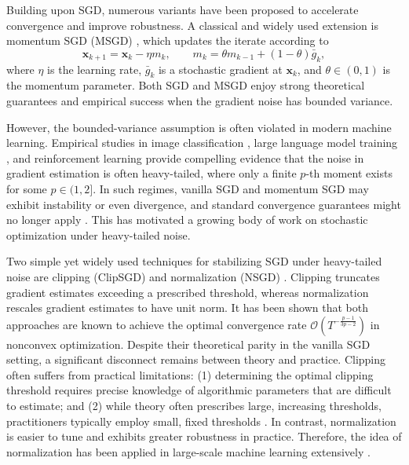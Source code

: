 \documentclass{article}
\newcommand{\bx}{\boldsymbol{x}}
\newcommand{\barg}{\bar{g}}
\theoremstyle{plain}
\theoremstyle{definition}
\theoremstyle{remark}
\begin{document}
Building upon SGD, numerous variants have been proposed to accelerate convergence and improve robustness. A classical and widely used extension is momentum SGD (MSGD) \citep{Polyak1964Some, Liu2020Improved}, which updates the iterate according to
\begin{equation}\label{rule2}
\bx_{k+1} = \bx_k - \eta m_k,
\qquad
m_k = \theta m_{k-1} + (1-\theta)\barg_k,
\end{equation}
where $\eta$ is the learning rate, $\barg_k$ is a stochastic gradient at $\bx_k$, and $\theta \in (0,1)$ is the momentum parameter. Both SGD and MSGD enjoy strong theoretical guarantees and empirical success when the gradient noise has bounded variance.

However, the bounded-variance assumption is often violated in modern machine learning. Empirical studies in image classification \citep{Battash2024Revisiting}, large language model training \citep{Zhang2020Adaptive,Ahn2024Linear}, and reinforcement learning \citep{Garg2021Proximal} provide compelling evidence that the noise in gradient estimation is often heavy-tailed, where only a finite $p$-th moment exists for some $p\in(1,2]$. In such regimes, vanilla SGD and momentum SGD may exhibit instability or even divergence, and standard convergence guarantees might no longer apply \cite{Gorbunov2020Stochastic}. This has motivated a growing body of work on stochastic optimization under heavy-tailed noise.






Two simple yet widely used techniques for stabilizing SGD under heavy-tailed noise are clipping (ClipSGD) \citep{Zhang2020Adaptive} and normalization (NSGD) \citep{Cutkosky2020Momentum}. Clipping truncates gradient estimates exceeding a prescribed threshold, whereas  normalization rescales gradient estimates to have unit norm. It has been shown that both approaches are known to achieve the optimal convergence rate $\mathcal{O}(T^{-\frac{p-1}{3p-2}})$ in nonconvex optimization. Despite their theoretical parity in the vanilla SGD setting, a significant disconnect remains between theory and practice. Clipping often suffers from practical limitations: (1) determining the optimal clipping threshold requires precise knowledge of algorithmic parameters that are difficult to estimate; and (2) while theory often prescribes large, increasing thresholds, practitioners typically employ small, fixed thresholds \citep{Zhang2022Opt,Liu2024Sophia}. In contrast, normalization is easier to tune and exhibits greater robustness in practice. Therefore, the idea of normalization has been applied in large-scale machine learning extensively \citep{you2017large,you2018imagenet,you2019large,touvron2023llama}. 
\end{document}
